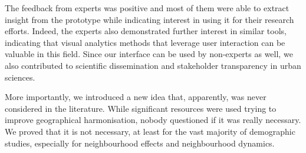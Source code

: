 \documentclass[10pt,letterpaper]{article}
\newcommand{\censure}[1]{}
\begin{document}
The feedback from experts was positive and most of them were able to extract
insight from the prototype while indicating interest in using it for their
research efforts. Indeed, the experts also demonstrated further interest in
similar tools, indicating that visual analytics methods that leverage user
interaction can be valuable in this field.  Since our interface can be used by
non-experts as well, we also contributed to scientific dissemination and
stakeholder transparency in urban sciences.


More importantly, we introduced a new idea that, apparently, was never
considered in the literature. While significant resources were used trying to
improve geographical harmonisation, nobody questioned if it was really
necessary. We proved that it is not necessary, at least for the vast majority of
demographic studies, especially for  neighbourhood effects and neighbourhood
dynamics.

\censure{
\section*{Acknowledgement}
This research was supported by a University of Toronto Connaught Global
Challenge grant and is part of the Urban Genome Project. The authors thank Cary
Wu, Ethan Fosse, Fernando Calderón Figueroa, Patrick Adler, and James Murdoch
for their expert opinions; Mark S. Fox, Robert M. Wright, Ultan Byrne, Matti
Siemiatycki, Shauna Brail, and Richard Florida for general guidance and support;
and the anonymous reviewers for their constructive comments.
}



\end{document}
